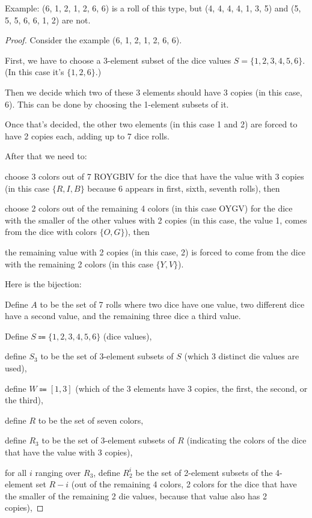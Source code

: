 \documentclass[14pt]{extarticle}
\begin{document}
Example: (6, 1, 2, 1, 2, 6, 6) is a roll of this type, but (4, 4, 4, 4, 1, 3, 5) and (5, 5, 5, 6, 6, 1, 2) are not.
\begin{proof}
Consider the example (6, 1, 2, 1, 2, 6, 6).

First, we have to choose a 3-element subset of the dice values $S = \{1,2,3,4,5,6\}$. (In this case it's $\{1,2,6\}$.)

Then we decide which two of these 3 elements should have 3 copies (in this case, 6). This can be done by choosing the 1-element subsets of it.

Once that's decided, the other two elements (in this case 1 and 2) are forced to have 2 copies each, adding up to 7 dice rolls.

After that we need to: 

choose 3 colors out of 7 ROYGBIV for the dice that have the value with 3 copies (in this case $\{R,I,B\}$ because 6 appears in first, sixth, seventh rolls), then 

choose 2 colors out of the remaining 4 colors (in this case OYGV) for the dice with the smaller of the other values with 2 copies (in this case, the value 1, comes from the dice with colors $\{O,G\}$), then

the remaining value with 2 copies (in this case, 2) is forced to come from the dice with the remaining 2 colors (in this case $\{Y,V\}$).

Here is the bijection:

Define $A$ to be the set of 7 rolls where two dice have one value, two different dice have a second value, and the remaining three dice a third value.

Define $S \Coloneqq \{1,2,3,4,5,6\}$ (dice values),

define $S_3$ to be the set of 3-element subsets of $S$ (which 3 distinct die values are used),

define $W \Coloneqq [1,3]$ (which of the 3 elements have 3 copies, the first, the second, or the third),

define $R$ to be the set of seven colors,

define $R_3$ to be the set of 3-element subsets of $R$ (indicating the  colors of the dice that have the value with 3 copies),

for all $i$ ranging over $R_3$, define $R_2^i$ be the set of 2-element subsets of the 4-element set $R - i$ (out of the remaining 4 colors, 2 colors for the dice that have the smaller of the remaining 2 die values, because that value also has 2 copies),


\end{proof}
\end{document}
